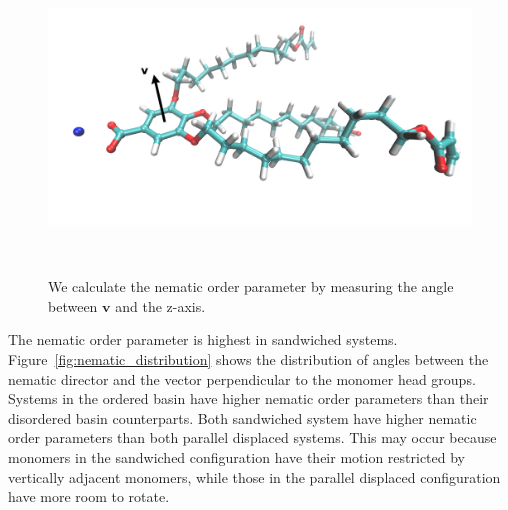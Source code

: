 \documentclass{article}
\begin{document}
  \begin{figure}[!htb]
  \centering
  \includegraphics[width=0.75\linewidth]{nematic_director.png}
  \caption{We calculate the nematic order parameter by measuring the angle
  between $\mathbf{v}$ and the z-axis.}~\label{fig:director}
  \end{figure}

  The nematic order parameter is highest in sandwiched systems. 
  Figure~\ref{fig:nematic_distribution} shows the distribution of angles between
  the nematic director and the vector perpendicular to the monomer head groups. 
  Systems in the ordered basin have higher nematic order parameters than their
  disordered basin counterparts. Both sandwiched system have higher nematic order
  parameters than both parallel displaced systems. This may occur because monomers
  in the sandwiched configuration have their motion restricted by vertically adjacent
  monomers, while those in the parallel displaced configuration have more room to 
  rotate.
  
  \clearpage
\end{document}
